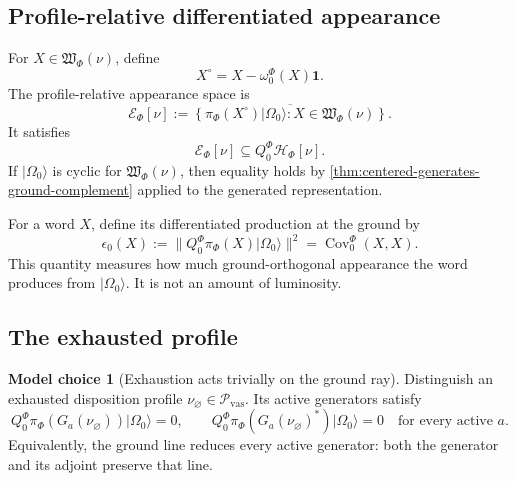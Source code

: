 \documentclass[11pt,reqno]{scrartcl}
\newcommand{\piF}{\pi_{\Phi}}
\newcommand{\omegaF}{\omega_{0}^{\Phi}}
\newcommand{\QzeroF}{Q_{0}^{\Phi}}
\newcommand{\idop}{\mathbf 1}
\newcommand{\ket}[1]{\lvert #1\rangle}
\newcommand{\vasSpace}{\mathcal P_{\mathrm{vas}}}
\newcommand{\vas}{\nu}
\newcommand{\vasEmpty}{\nu_{\varnothing}}
\newcommand{\wordSet}{\mathfrak W_{\Phi}}
\newcommand{\Hvas}{\mathscr H_{\Phi}[\nu]}
\newcommand{\Evas}{\mathscr E_{\Phi}[\nu]}
\DeclareMathOperator{\Cov}{Cov}
\theoremstyle{plain}
\theoremstyle{definition}
\newtheorem{modelchoice}[modelchoice]{Model choice}
\theoremstyle{remark}
\begin{document}
\subsection{Profile-relative differentiated appearance}

For $X\in\wordSet(\vas)$, define
\begin{equation}
  X^{\circ}=X-\omegaF(X)\idop.
\end{equation}
The profile-relative appearance space is
\begin{equation}
  \boxed{
  \Evas
  :=\overline{
      \left\{
        \piF(X^{\circ})\ket{\Omega_0}:
        X\in\wordSet(\vas)
      \right\}
    }.}
  \label{eq:profile-relative-appearance-space}
\end{equation}
It satisfies
\begin{equation}
  \Evas\subseteq\QzeroF\Hvas.
  \label{eq:profile-appearance-inclusion}
\end{equation}
If $\ket{\Omega_0}$ is cyclic for $\wordSet(\vas)$, then equality holds by
\cref{thm:centered-generates-ground-complement} applied to the generated
representation.

For a word $X$, define its differentiated production at the ground by
\begin{equation}
  \epsilon_0(X)
  :=\|\QzeroF\piF(X)\ket{\Omega_0}\|^2
  =\Cov_0^{\Phi}(X,X).
  \label{eq:differentiated-production-functional}
\end{equation}
This quantity measures how much ground-orthogonal appearance the word
produces from $\ket{\Omega_0}$.  It is not an amount of luminosity.

\subsection{The exhausted profile}

\begin{modelchoice}[Exhaustion acts trivially on the ground ray]
\label{choice:exhausted-profile-ground-triviality}
Distinguish an exhausted disposition profile
$\vasEmpty\in\vasSpace$.  Its active generators satisfy
\begin{equation}
  \boxed{
  \QzeroF\piF(G_a(\vasEmpty))\ket{\Omega_0}=0,
  \qquad
  \QzeroF\piF(G_a(\vasEmpty)^*)\ket{\Omega_0}=0
  \quad
  \text{for every active }a.}
  \label{eq:exhausted-generator-ground-triviality}
\end{equation}
Equivalently, the ground line reduces every active generator: both the generator and its adjoint preserve that line.
\end{modelchoice}
\end{document}
